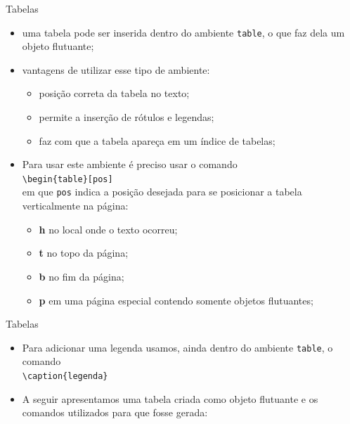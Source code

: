 \documentclass[c]{beamer}
\begin{document}
{\begin{frame}[fragile]{\sc Tabelas}
	\begin{itemize}
		\setlength\itemsep{0.3cm}
		\item uma tabela pode ser inserida dentro do {\color{blue} ambiente \verb|table|}, o que faz dela
		um {\color{blue} objeto flutuante};
		\item {\color{blue} vantagens} de utilizar esse tipo de ambiente:
		\begin{itemize}
			\item posição correta da tabela no texto;
			\item permite a inserção de rótulos e legendas;
			\item faz com que a tabela apareça em um índice de tabelas;
		\end{itemize}
		\item Para usar este ambiente é preciso usar o comando\\ 
		\verb|\begin{table}[pos]|\\
		em que {\color{blue} \verb|pos|} indica a posição desejada para se {\color{blue} posicionar a tabela verticalmente} na página: 
		\begin{itemize}
			\item \textbf{h} no local onde o texto ocorreu;
			\item \textbf{t} no topo da página;
			\item \textbf{b} no fim da página;
			\item \textbf{p} em uma página especial contendo somente objetos flutuantes;
		\end{itemize}
	\end{itemize}
\end{frame}
%
\begin{frame}[fragile]{\sc Tabelas}
	\begin{itemize}
				\setlength\itemsep{0.3cm}
		\item Para {\color{blue} adicionar uma legenda} usamos, ainda dentro do ambiente \verb|table|, o comando\\
		\verb|\caption{legenda}|
		\item A seguir apresentamos uma tabela criada como objeto flutuante e os comandos utilizados para que fosse gerada:
	\end{itemize}
\end{frame}

}
\end{document}
